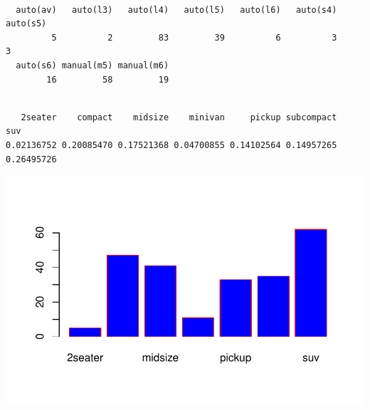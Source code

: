 \documentclass[
  letterpaper,
  DIV=11,
  numbers=noendperiod]{scrreprt}
\newenvironment{Shaded}{\begin{snugshade}}{\end{snugshade}}
\newcommand{\AttributeTok}[1]{\textcolor[rgb]{0.40,0.45,0.13}{#1}}
\newcommand{\FunctionTok}[1]{\textcolor[rgb]{0.28,0.35,0.67}{#1}}
\newcommand{\NormalTok}[1]{\textcolor[rgb]{0.00,0.23,0.31}{#1}}
\newcommand{\OtherTok}[1]{\textcolor[rgb]{0.00,0.23,0.31}{#1}}
\newcommand{\SpecialCharTok}[1]{\textcolor[rgb]{0.37,0.37,0.37}{#1}}
\newcommand{\StringTok}[1]{\textcolor[rgb]{0.13,0.47,0.30}{#1}}
\begin{document}
\begin{Shaded}
\end{Shaded}

\begin{verbatim}

  auto(av)   auto(l3)   auto(l4)   auto(l5)   auto(l6)   auto(s4)   auto(s5) 
         5          2         83         39          6          3          3 
  auto(s6) manual(m5) manual(m6) 
        16         58         19 
\end{verbatim}

\begin{Shaded}
\end{Shaded}

\begin{verbatim}

   2seater    compact    midsize    minivan     pickup subcompact        suv 
0.02136752 0.20085470 0.17521368 0.04700855 0.14102564 0.14957265 0.26495726 
\end{verbatim}

\begin{Shaded}
\end{Shaded}

\includegraphics{data_analysis_files/figure-pdf/unnamed-chunk-3-1.pdf}
\end{document}

